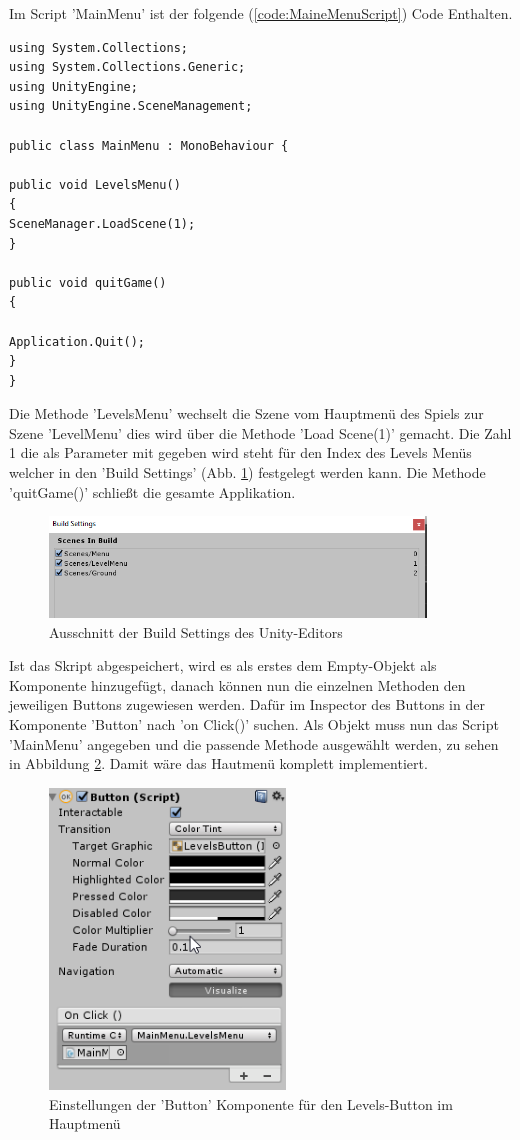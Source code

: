 Im Script 'MainMenu' ist der folgende (\cref{code:MaineMenuScript}) Code Enthalten.

\begin{lstlisting}[language={[Sharp]C}, caption=MainMenu-Script, label=code:MaineMenuScript]
using System.Collections;
using System.Collections.Generic;
using UnityEngine;
using UnityEngine.SceneManagement;

public class MainMenu : MonoBehaviour {

public void LevelsMenu()
{
SceneManager.LoadScene(1);
}

public void quitGame()
{

Application.Quit();
}
}

\end{lstlisting}

Die Methode 'LevelsMenu' wechselt die Szene vom Hauptmenü des Spiels zur Szene 'LevelMenu' dies wird über die Methode 'Load Scene(1)' gemacht. Die Zahl 1 die als Parameter mit gegeben wird steht für den Index des Levels Menüs welcher in den 'Build Settings' (Abb. \ref{BuildSettings}) festgelegt werden kann. Die Methode 'quitGame()' schließt die gesamte Applikation.
\begin{figure}[H]
	\includegraphics[width=10cm]{images/BuildSettings.png}
	\caption{Ausschnitt der Build Settings des Unity-Editors}
	\label{BuildSettings}
\end{figure}

Ist das Skript abgespeichert, wird es als erstes dem Empty-Objekt als Komponente hinzugefügt, danach können nun die einzelnen Methoden den jeweiligen Buttons zugewiesen werden. Dafür im Inspector des Buttons in der Komponente 'Button' nach 'on Click()' suchen. Als Objekt muss nun das Script 'MainMenu' angegeben und die passende Methode ausgewählt werden, zu sehen in Abbildung \ref{onClick}. Damit wäre das Hautmenü komplett implementiert.

\begin{figure}[H]
	\includegraphics[height=8cm]{images/ButtonScriptLevelsButton.png}
	\caption{Einstellungen der 'Button' Komponente für den Levels-Button im Hauptmenü}
	\label{onClick}
\end{figure}

